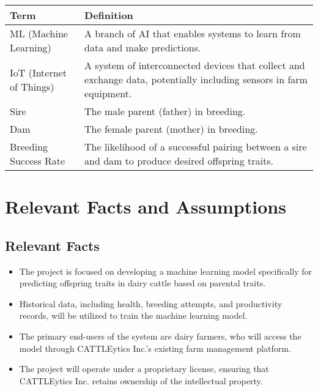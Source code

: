 \documentclass[12pt]{article}
\begin{document}
\begin{tabularx}{\textwidth}{|l|X|}
    \hline
    \textbf{Term} & \textbf{Definition} \\
    \hline
    ML (Machine Learning) & A branch of AI that enables systems to learn from 
    data and make predictions. \\
    \hline
    IoT (Internet of Things) & A system of interconnected devices that collect 
    and exchange data, potentially including sensors in farm equipment. \\
    \hline
    Sire & The male parent (father) in breeding. \\
    \hline
    Dam & The female parent (mother) in breeding. \\
    \hline
    Breeding Success Rate & The likelihood of a successful pairing between a 
    sire and dam to produce desired offspring traits. \\
    \hline
\end{tabularx}

\section{Relevant Facts and Assumptions}

\subsection{Relevant Facts}
\begin{itemize}
    \item The project is focused on developing a machine learning model 
    specifically for predicting offspring traits in dairy cattle based on 
    parental traits.
    \item Historical data, including health, breeding attempts, and 
    productivity records, will be utilized to train the machine learning model.
    \item The primary end-users of the system are dairy farmers, who will 
    access the model through CATTLEytics Inc.'s existing farm management 
    platform.
    \item The project will operate under a proprietary license, ensuring that 
    CATTLEytics Inc. retains ownership of the intellectual property.
\end{itemize}
\end{document}
